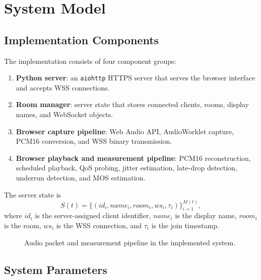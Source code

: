 \documentclass[conference]{IEEEtran}
\begin{document}
\section{System Model}

\subsection{Implementation Components}

The implementation consists of four component groups:
\begin{enumerate}
    \item \textbf{Python server}: an \texttt{aiohttp} HTTPS server that serves the browser interface and accepts WSS connections.
    \item \textbf{Room manager}: server state that stores connected clients, rooms, display names, and WebSocket objects.
    \item \textbf{Browser capture pipeline}: Web Audio API, AudioWorklet capture, PCM16 conversion, and WSS binary transmission.
    \item \textbf{Browser playback and measurement pipeline}: PCM16 reconstruction, scheduled playback, QoS probing, jitter estimation, late-drop detection, underrun detection, and MOS estimation.
\end{enumerate}

The server state is
\begin{equation}
    S(t)=\{(id_i,name_i,room_i,ws_i,\tau_i)\}_{i=1}^{M(t)},
    \label{eq:server_state}
\end{equation}
where $id_i$ is the server-assigned client identifier, $name_i$ is the display name, $room_i$ is the room, $ws_i$ is the WSS connection, and $\tau_i$ is the join timestamp.

\begin{figure}[H]
    \centering
    \caption{Audio packet and measurement pipeline in the implemented system.}
    \label{fig:pipeline}
\end{figure}

\subsection{System Parameters}
\end{document}
